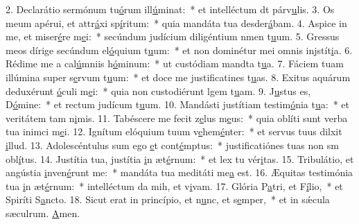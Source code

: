 2. Declarátio sermónum tu\uline{ó}rum ill\uline{ú}minat:~* et intelléctum dt párv\uline{u}lis.
3. Os meum apérui, et attr\uline{á}xi sp\uline{í}ritum:~* quia mandáta tua desder\uline{á}bam.
4. Aspice in me, et miser\uline{é}re m\uline{e}i:~* secúndum judícium diligéntium nmen t\uline{u}um.
5. Gressus meos dírige secúndum el\uline{ó}quium t\uline{u}um:~* et non dominétur mei omnis injstít\uline{i}a.
6. Rédime me a cal\uline{ú}mniis h\uline{ó}minum:~* ut custódiam mandta t\uline{u}a.
7. Fáciem tuam illúmina super s\uline{e}rvum t\uline{u}um:~* et doce me justificatines t\uline{u}as.
8. Exitus aquárum deduxérunt \uline{ó}culi m\uline{e}i:~* quia non custodiérunt lgem t\uline{u}am.
9. J\uline{u}stus es, D\uline{ó}mine:~* et rectum judícum t\uline{u}um.
10. Mandásti justítiam testim\uline{ó}nia t\uline{u}a:~* et veritátem tam n\uline{i}mis.
11. Tabéscere me fecit z\uline{e}lus m\uline{e}us:~* quia oblíti sunt verba tua inimci m\uline{e}i.
12. Ignítum elóquium tuum v\uline{e}hem\uline{é}nter:~* et servus tuus dilxit \uline{i}llud.
13. Adolescéntulus sum ego \uline{e}t cont\uline{é}mptus:~* justificatiónes tuas non sm obl\uline{í}tus.
14. Justítia tua, justítia \uline{i}n æt\uline{é}rnum:~* et lex tu vér\uline{i}tas.
15. Tribulátio, et angústia \uline{i}nven\uline{é}runt me:~* mandáta tua meditáti me\uline{a} est.
16. Æquitas testimónia tua \uline{i}n æt\uline{é}rnum:~* intelléctum da mih, et v\uline{i}vam.
17. Glória P\uline{a}tri, et F\uline{í}lio,~* et Spiríti S\uline{a}ncto.
18. Sicut erat in princípio, et n\uline{u}nc, et s\uline{e}mper,~* et in sǽcula sæculrum. \uline{A}men.
